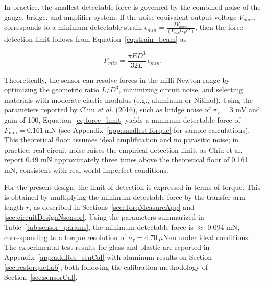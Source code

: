 In practice, the smallest detectable force is governed by the combined noise of the gauge, bridge, and amplifier system. 
If the noise-equivalent output voltage $V_{noise}$ corresponds to a minimum detectable strain $\epsilon_{min} = \frac{2V_{noise}}{(V_{exc} G_F G)}$, then the force detection limit follows from Equation~\ref{eq:strain_beam} as

\begin{equation}
	F_{min} = \frac{\pi E D^3}{32 L} \, \epsilon_{min}.
	\label{eq:force_limit}
\end{equation}

Theoretically, the sensor can resolve forces in the milli-Newton range by optimizing the geometric ratio $L/D^3$, minimizing circuit noise, and selecting materials with moderate elastic modulus (e.g., aluminum or Nitinol). Using the parameters reported by Chiu \textit{et al.} (2016), such as bridge noise of $\sigma_V = 3$ mV and gain of 100, Equation~\ref{eq:force_limit} yields a minimum detectable force of $F_{\min} = 0.161~$mN (see Appendix~\ref{app:smallestTorque} for sample calculations). This theoretical floor assumes ideal amplification and no parasitic noise; in practice, real circuit noise raises the empirical detection limit, as Chiu et al. report 0.49 mN approximately three times above the theoretical floor of 0.161 mN, consistent with real-world imperfect conditions.

For the present design, the limit of detection is expressed in terms of torque. This is obtained by multiplying the minimum detectable force by the transfer arm length $r$, as described in Sections~\ref{sec:TorqMeasureApp} and \ref{sec:circuitDesignNsensor}. Using the parameters summarized in Table~\ref{tab:sensor_params}, the minimum detectable force is $\approx$ 0.094 mN, corresponding to a torque resolution of $\sigma_{\tau} = 4.70~\mu$N$\cdot$m under ideal conditions. The experimental test results for glass and plastic are reported in Appendix~\ref{app:addRes_senCal} with aluminum results on Section \ref{sec:restorqueLab}, both following the calibration methodology of Section~\ref{sec:sensorCal}.

